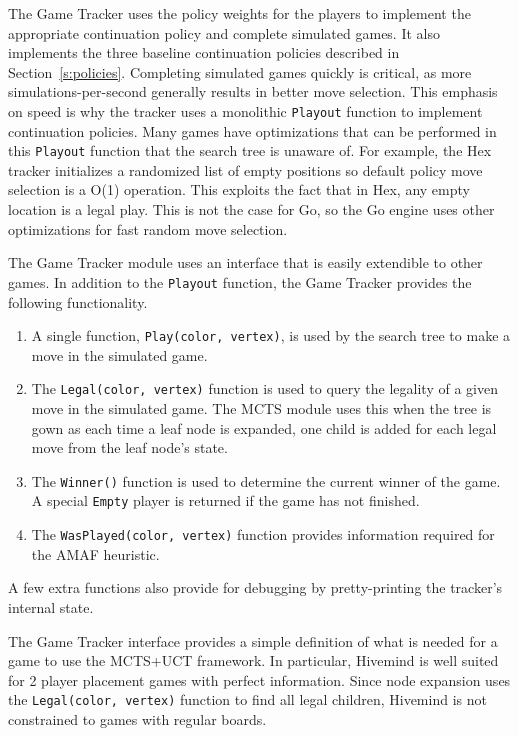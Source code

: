 \documentclass{acm_proc_article-sp}
\begin{document}
The Game Tracker uses the policy weights for the players to implement the appropriate continuation policy and complete simulated games. 
It also implements the three baseline continuation policies described in Section~\ref{s:policies}.
Completing simulated games quickly is critical, as more simulations-per-second generally results in better move selection. 
This emphasis on speed is why the tracker uses a monolithic \texttt{Playout} function
to implement continuation policies.
Many games have optimizations that can be performed in this \texttt{Playout} function that the search tree is unaware of. 
For example, the Hex tracker initializes a randomized list of empty positions so default policy move selection is a O(1) operation. 
This exploits the fact that in Hex, any empty location is a legal play. 
This is not the case for Go, so the Go engine uses other optimizations for fast random move selection.

The Game Tracker module uses an interface that is easily extendible to other games. 
In addition to the \texttt{Playout} function, the Game Tracker provides the following functionality.

\begin{enumerate}
\item A single function, \texttt{Play(color, vertex)}, is used by the search tree to make a move in the simulated game.
\item The \texttt{Legal(color, vertex)} function is used to query the legality of a given move in the simulated game. 
The MCTS module uses this when the tree is gown as each time a leaf node is expanded,
one child is added for each legal move from the leaf node's state.
\item The \texttt{Winner()} function is used to determine the current winner of the game. 
	A special \texttt{Empty} player is returned if the game has not finished.
\item The \texttt{WasPlayed(color, vertex)} function provides information required for the AMAF heuristic.
\end{enumerate}

A few extra functions also provide for debugging by pretty-printing the tracker's internal state.

The Game Tracker interface provides a simple definition of what is needed for a game to use the MCTS+UCT framework. 
In particular, Hivemind is well suited for 2 player placement games with perfect information. 
Since node expansion uses the \texttt{Legal(color, vertex)} function to find all legal children,
Hivemind is not constrained to games with regular boards.
\end{document}
